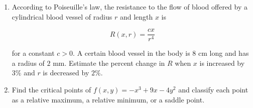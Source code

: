 \documentclass[a4paper, 12pt]{article}
\renewcommand{\headrulewidth}{0pt}
\begin{document}
\begin{enumerate}[leftmargin=*,label=\textbf{\arabic*.}]
where $u=(x,y)$ and $v=v(x,y)$.

Let $x=r\cos\theta$ and $y=r\sin\theta$. Show that the Cauchy-Riemann equations take the form
\[\frac{\partial u}{\partial r} = \frac{1}{r} \frac{\partial v}{\partial\theta} \quad\text{and}\quad\frac1r\frac{\partial u}{\partial\theta}=-\frac{\partial v}{\partial r}.\]

\newpage

\item According to Poiseuille’s law, the resistance to the flow of blood offered by a cylindrical blood vessel of radius $r$ and length $x$ is

\[R(x,r) = \frac{cx}{r^4}\]

for a constant $c > 0$. A certain blood vessel in the body is 8 cm long and has a radius of $2$ mm. Estimate the percent change in $R$ when $x$ is increased by $3\%$ and $r$ is decreased by $2\%$.

\item Find the critical points of $f(x, y)=-x^3+9x-4y^2$ and classify each point as a relative maximum, a relative minimum, or a saddle point.

\end{enumerate}

\newpage
\pagestyle{fancy}
\renewcommand{\headrulewidth}{1pt}

\end{document}
